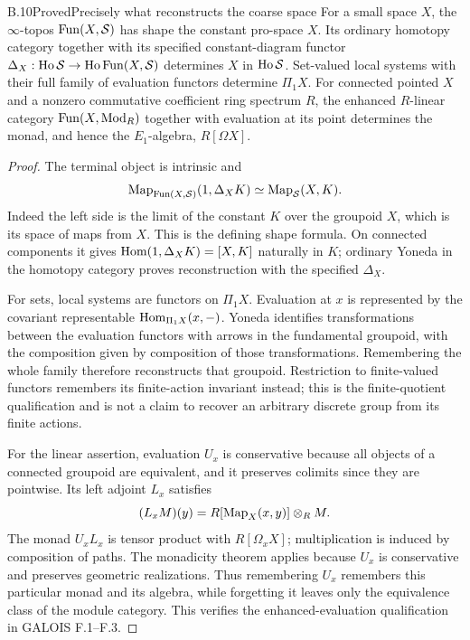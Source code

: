 \begin{statement}{B.10}{Proved}{Precisely what reconstructs the coarse space}
For a small space $X$, the $\infty$-topos $\operatorname{Fun}(X,\mathcal S)$ has shape
the constant pro-space $X$. Its ordinary homotopy category together
with its specified constant-diagram functor
$\Delta_X:\operatorname{Ho}\mathcal S\to\operatorname{Ho}\operatorname{Fun}(X,\mathcal S)$ determines $X$ in
$\operatorname{Ho}\mathcal S$. Set-valued local systems with their full family of
evaluation functors determine $\Pi_1X$. For connected pointed $X$ and
a nonzero commutative coefficient ring spectrum $R$, the enhanced $R$-linear
category $\operatorname{Fun}(X,\operatorname{Mod}_R)$ together with evaluation at its
point determines the monad, and hence the $E_1$-algebra, $R[\Omega X]$.
\end{statement}
\begin{proof}
The terminal object is intrinsic and
\[
 \operatorname{Map}_{\operatorname{Fun}(X,\mathcal S)}(1,\Delta_XK)\simeq\operatorname{Map}_{\mathcal S}(X,K).
\]
Indeed the left side is the limit of the constant $K$ over the groupoid
$X$, which is its space of maps from $X$. This is the defining shape
formula. On connected components it gives
$\operatorname{Hom}(1,\Delta_XK)=[X,K]$ naturally in $K$; ordinary Yoneda in the
homotopy category proves reconstruction with the specified $\Delta_X$.

For sets, local systems are functors on $\Pi_1X$. Evaluation at $x$ is
represented by the covariant representable
$\operatorname{Hom}_{\Pi_1X}(x,-)$. Yoneda identifies transformations between the
evaluation functors with arrows in the fundamental groupoid, with the
composition given by composition of those transformations. Remembering
the whole family therefore reconstructs that groupoid. Restriction to
finite-valued functors remembers its finite-action invariant instead;
this is the finite-quotient qualification and is not a claim to recover
an arbitrary discrete group from its finite actions.

For the linear assertion, evaluation $U_x$ is conservative because all
objects of a connected groupoid are equivalent, and it preserves
colimits since they are pointwise. Its left adjoint $L_x$ satisfies
\[
 (L_xM)(y)=R[\operatorname{Map}_X(x,y)]\otimes_R M.
\]
The monad $U_xL_x$ is tensor product with $R[\Omega_xX]$; multiplication
is induced by composition of paths. The monadicity theorem
\citep[Theorem 4.7.3.5]{LurieHA} applies because $U_x$ is conservative
and preserves geometric realizations. Thus remembering $U_x$ remembers
this particular monad and its algebra, while forgetting it leaves only
the equivalence class of the module category. This verifies the
enhanced-evaluation qualification in GALOIS F.1--F.3.
\end{proof}


